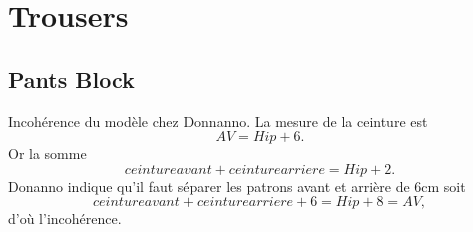 \documentclass[11pt,a4paper]{report}
\begin{document}
\section{Trousers}


\subsection{Pants Block}

Incohérence du modèle chez Donnanno. La mesure de la ceinture est
$$AV = Hip + 6.$$
Or la somme
$$ceinture avant + ceinture arriere = Hip +2.$$
Donanno indique qu'il faut séparer les patrons avant et arrière de 6cm soit
$$ceinture avant + ceinture arriere + 6 = Hip +8 = AV,$$
d'où l'incohérence.




\end{document}
